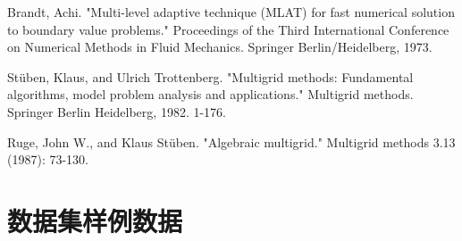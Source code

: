 \begin{enumerate}[{[}1{]}]
\item Brandt, Achi. "Multi-level adaptive technique (MLAT) for fast numerical solution to boundary value problems." Proceedings of the Third International Conference on Numerical Methods in Fluid Mechanics. Springer Berlin/Heidelberg, 1973.
\item Stüben, Klaus, and Ulrich Trottenberg. "Multigrid methods: Fundamental algorithms, model problem analysis and applications." Multigrid methods. Springer Berlin Heidelberg, 1982. 1-176.
\item Ruge, John W., and Klaus Stüben. "Algebraic multigrid." Multigrid methods 3.13 (1987): 73-130.
\end{enumerate}

\chapter{数据集样例数据}

